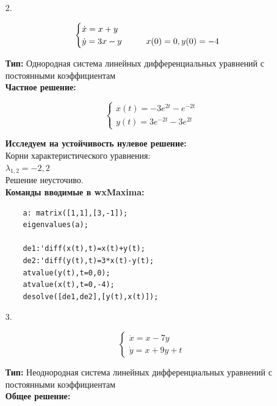 \documentclass[a4paper, 12pt, oneside]{scrartcl}
\newcommand\tab[1][1cm]{\hspace*{#1}}
\begin{document}
\begin{enumerate}
		\item[2.]
		
		\begin{equation*}
			\begin{cases}
			\dot{x}= x + y\\
			\dot{y}= 3x - y

			\tab 
			x(0) = 0, y(0) = -4
			\end{cases}
		\end{equation*}


		\textbf{Тип:}
		 Однородная система линейных  дифференциальных уравнений с постоянными коэффициентам  \\
	
		\textbf{Частное решение: }

		\begin{equation*}
			\begin{cases}
			x(t)=-3e^{2t}-e^{-2t} \\
			y(t)=3e^{-2t}-3e^{2t} 
			\end{cases}
		\end{equation*}

		
		\textbf{Исследуем на устойчивость нулевое решение: } \\
		Корни характеристического уравнения:\\
		$\lambda_{1,2}= {-2, 2}$\\
		Решение неусточиво. \\ 
		
		\textbf{Команды вводимые в wxMaxima: }
		\begin{verbatim}
	a: matrix([1,1],[3,-1]);
	eigenvalues(a);
	
	de1:'diff(x(t),t)=x(t)+y(t);
	de2:'diff(y(t),t)=3*x(t)-y(t);
	atvalue(y(t),t=0,0);
	atvalue(x(t),t=0,-4);
	desolve([de1,de2],[y(t),x(t)]);
	\end{verbatim}


		\item[3.]
		
		\begin{equation*}
			\begin{cases}
			\dot{x}=  x - 7y\\
			\dot{y}= x + 9y + t

			\end{cases}
		\end{equation*}


		\textbf{Тип:  }
	Неоднородная система линейных  дифференциальных уравнений с постоянными коэффициентам \\
		\textbf{Общее решение: }


\end{enumerate}
\end{document}
